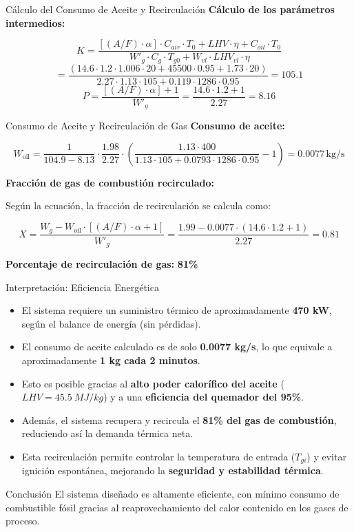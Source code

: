 \documentclass[main.tex]{subfiles}
\begin{document}
\begin{frame}{Cálculo del Consumo de Aceite y Recirculación}
\textbf{Cálculo de los parámetros intermedios:}

\[
K = \frac{[(A/F) \cdot \alpha] \cdot C_{air} \cdot T_0 + LHV \cdot \eta + C_{oil} \cdot T_0}
{W'_g \cdot C_g \cdot T_{g0} + W_{vl} \cdot LHV_{vl} \cdot \eta}
\]
\[= \frac{(14.6 \cdot 1.2 \cdot 1.006 \cdot 20 + 45500 \cdot 0.95 + 1.73 \cdot 20)}
{2.27 \cdot 1.13 \cdot 105 + 0.119 \cdot 1286 \cdot 0.95} = 105.1\]
\[
P = \frac{[(A/F) \cdot \alpha] + 1}{W'_g} = \frac{14.6 \cdot 1.2 + 1}{2.27} = 8.16
\]

\end{frame}

\begin{frame}{Consumo de Aceite y Recirculación de Gas}
\textbf{Consumo de aceite:}

\[
W_{\text{oil}} =
\frac{1}{104.9 - 8.13} \cdot 
\frac{1.98}{2.27} \cdot 
\left( \frac{1.13 \cdot 400}{1.13 \cdot 105 + 0.0793 \cdot 1286 \cdot 0.95} - 1 \right)
= 0.0077 \, \text{kg/s}
\]

\vspace{1em}
\textbf{Fracción de gas de combustión recirculado:}

Según la ecuación, la fracción de recirculación se calcula como:

\[
X = \frac{W_g - W_{\text{oil}} \cdot [(A/F) \cdot \alpha + 1]}{W'_g}
= \frac{1.99 - 0.0077 \cdot (14.6 \cdot 1.2 + 1)}{2.27} = 0.81
\]

\vspace{0.5em}
\textbf{Porcentaje de recirculación de gas:} \quad \textbf{81\%}
\end{frame}

\begin{frame}{Interpretación: Eficiencia Energética}
\small
\begin{itemize}
  \item El sistema requiere un suministro térmico de aproximadamente \textbf{470 kW}, según el balance de energía (sin pérdidas).
  \item El consumo de aceite calculado es de solo \textbf{0.0077 kg/s}, lo que equivale a aproximadamente \textbf{1 kg cada 2 minutos}.
  \item Esto es posible gracias al \textbf{alto poder calorífico del aceite} ($LHV = \SI{45.5}{MJ/kg}$) y a una \textbf{eficiencia del quemador del 95\%}.
  \item Además, el sistema recupera y recircula el \textbf{81\% del gas de combustión}, reduciendo así la demanda térmica neta.
  \item Esta recirculación permite controlar la temperatura de entrada ($T_{gi}$) y evitar ignición espontánea, mejorando la \textbf{seguridad y estabilidad térmica}.
\end{itemize}

\begin{alertblock}{Conclusión}
El sistema diseñado es altamente eficiente, con mínimo consumo de combustible fósil gracias al reaprovechamiento del calor contenido en los gases de proceso.
\end{alertblock}
\end{frame}
\end{document}
